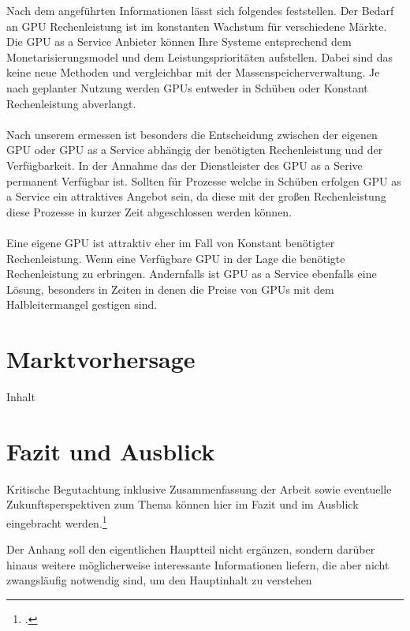 \documentclass[12pt,toc=bib,toc=listof]{scrreprt}
\newcounter{savepage}
\begin{document}
Nach dem angeführten Informationen lässt sich folgendes feststellen. 
Der Bedarf an GPU Rechenleistung ist im konstanten Wachstum für verschiedene Märkte. Die GPU as a Service Anbieter 
können Ihre Systeme entsprechend dem Monetarisierungsmodel und dem Leistungsprioritäten aufstellen. Dabei sind das 
keine neue Methoden und vergleichbar mit der Massenspeicherverwaltung. Je nach geplanter Nutzung werden GPUs 
entweder in Schüben oder Konstant Rechenleistung abverlangt.\\ \\
Nach unserem ermessen ist besonders die Entscheidung zwischen der eigenen GPU oder GPU as a Service abhängig der 
benötigten Rechenleistung und der Verfügbarkeit. In der Annahme das der Dienstleister des GPU as a Serive permanent 
Verfügbar ist. Sollten für Prozesse welche in Schüben erfolgen GPU as a Service ein attraktives Angebot sein, da 
diese mit der großen Rechenleistung diese Prozesse in kurzer Zeit abgeschlossen werden können.\\ \\
Eine eigene GPU ist attraktiv eher im Fall von Konstant benötigter Rechenleistung. Wenn eine Verfügbare GPU in der Lage 
die benötigte Rechenleistung zu erbringen. Andernfalls ist GPU as a Service ebenfalls eine Lösung, besonders in Zeiten 
in denen die Preise von GPUs mit dem Halbleitermangel gestigen sind.\\

\chapter{Marktvorhersage}
\label{sec:Marktvorhersage}

Inhalt

\chapter{Fazit und Ausblick} %
\label{sec:fazit}

Kritische Begutachtung inklusive Zusammenfassung der Arbeit sowie eventuelle Zukunftsperspektiven zum Thema können hier im Fazit und im Ausblick eingebracht werden.\footcite [Vgl.] [] {HAN2016S30}


\appendix
\newpage

\setcounter{page}{\thesavepage}

\label{sec:anhang}

Der Anhang soll den eigentlichen Hauptteil nicht ergänzen, sondern darüber hinaus weitere möglicherweise interessante Informationen liefern, die aber nicht zwangsläufig notwendig sind, um den Hauptinhalt zu verstehen
\end{document}
